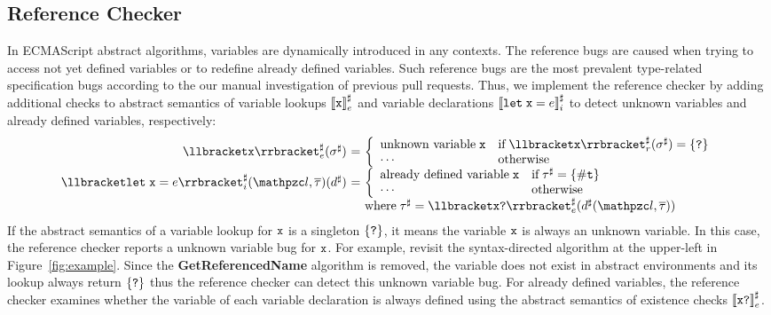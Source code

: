 \subsection{Reference Checker}

In ECMAScript abstract algorithms, variables are dynamically introduced in any
contexts.  The reference bugs are caused when trying to access not yet defined
variables or to redefine already defined variables.  Such reference bugs are the
most prevalent type-related specification bugs according to the our manual
investigation of previous pull requests.  Thus, we implement the reference
checker by adding additional checks to abstract semantics of variable lookups
${\llbracket{\texttt{x}}\rrbracket}^\sharp_e$ and variable declarations ${\llbracket{\texttt{let}\; \texttt{x}= e}\rrbracket}^\sharp_i$ to detect
unknown variables and already defined variables, respectively:
\[
  \begin{array}{r@{~}c@{~}l}
    \aseme{\x}(\aenv) &=& \left\{
      \begin{array}{ll}
        \text{unknown variable} \; $\x$
        & \text{if} \; \asemr{\x}(\aenv) = \{ \tabsent \}\\
        \cdots
        & \text{otherwise}\\
      \end{array}
    \right.\\

    \asemi{\kwlet \; \x = \expr}(\lab, \tys)(\aelem) &=& \left\{
      \begin{array}{ll}
        \text{already defined variable} \; $\x$
        & \text{if} \; \aty = \{ \true \}\\
        \cdots
        & \text{otherwise}\\
      \end{array}
    \right.\\ &&
    \text{where} \; \aty = \aseme{\x \kwexists}(\aelem(\lab, \tys))\\
  \end{array}
\]
If the abstract semantics of a variable lookup for $\texttt{x}$ is a singleton $\{
\texttt{?} \}$, it means the variable $\texttt{x}$ is always an unknown variable.  In this
case, the reference checker reports a unknown variable bug for $\texttt{x}$.  For
example, revisit the syntax-directed algorithm at the upper-left in
Figure~\ref{fig:example}.  Since the \textbf{GetReferencedName} algorithm is
removed, the variable  does not exist in abstract
environments and its lookup always return $\{ \texttt{?} \}$ thus the reference
checker can detect this unknown variable bug.  For already defined variables,
the reference checker examines whether the variable of each variable declaration
is always defined using the abstract semantics of existence checks ${\llbracket{\texttt{x}\texttt{?}}\rrbracket}^\sharp_e$.


